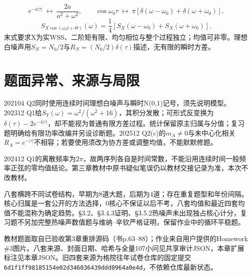\documentclass[11pt,fontset=fandol]{ctexart}
\begin{document}
\[e^{-a|\tau|}\ \longleftrightarrow\ \frac{2a}{a^2+\omega^2},\qquad
\cos\omega_0\tau\ \longleftrightarrow\ \pi[\delta(\omega-\omega_0)+\delta(\omega+\omega_0)].\]
\[S_{X\cos(\omega_0t+\Theta)}(\omega)=\frac14[S_X(\omega-\omega_0)+S_X(\omega+\omega_0)].\]
末式要求X为实WSS、二阶矩有限、均匀相位与整个过程独立；均值可非零。理想白噪声用$S_N=N_0/2$与$R_N=(N_0/2)\delta(\tau)$描述，无有限的瞬时方差。

\section{题面异常、来源与局限}

\begin{warnbox}[title=原题不自动等于自洽模型]202104 Q2同时使用连续时间理想白噪声与瞬时N(0,1)记号，须先说明模型。202312 Q1给$S_Y(\omega)=\omega^2/(\omega^2+16)$，其积分发散；可形式反变换为$\delta(\tau)-2e^{-4|\tau|}$，却不能视为普通有限方差过程。统计保留原主归属与分值；复习题明确给有限功率改编并另设诊断题。202512 Q2(c)的$m_A\ne0$与未中心化相关$R_A=e^{-|\tau|}$不相容；若要使用须改为协方差或调整均值，不能默默修题。\end{warnbox}

202412 Q1的离散频率为$2\pi$，故两序列各自是时间常数，不能沿用连续时间一般频率正弦的零均值结论。第三章教材中原书疑似笔误仍以教材交接记录为准，本次不改教材。

八套横跨不同试卷结构，早期为8道大题，后期为4道；存在重复题型和年份间隔。核心归属是一套公开的方法选择，0核心不保证以后不考，八套均值和最近四套均值不能混称为确定趋势。§3.2、§3.4.3证明、§3.5.2热噪声未出现独占核心计分，复习题不另加完整热噪声数值题与维纳–辛钦严格证明，保留作业中的循环平稳题。

教材题面取自已验收第3章重排源码（书p.63--88）；作业来自用户提供的Homework \#3图片。八套来源、封面日期、哈希与全量107小问见共享审计JSON，本章扩展标注见本章JSON。旧四套来源为格院往年试卷仓库的固定提交\texttt{6d1f1ff98185154e02d346036439ddd0964a0e4d}，不依赖仓库最新状态。
\end{document}

